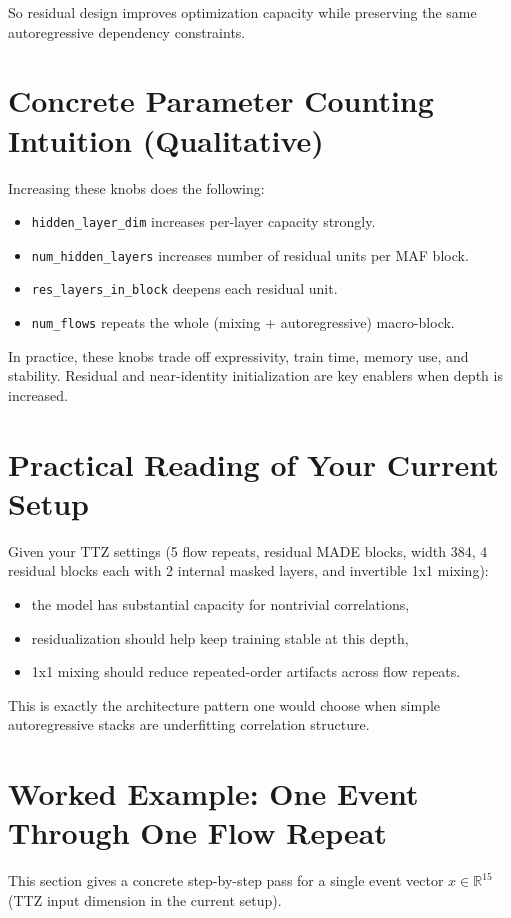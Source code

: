 \documentclass[11pt]{article}
\begin{document}
So residual design improves optimization capacity while preserving the same
autoregressive dependency constraints.

\section{Concrete Parameter Counting Intuition (Qualitative)}
Increasing these knobs does the following:
\begin{itemize}[leftmargin=*]
\item \texttt{hidden\_layer\_dim} increases per-layer capacity strongly.
\item \texttt{num\_hidden\_layers} increases number of residual units per MAF block.
\item \texttt{res\_layers\_in\_block} deepens each residual unit.
\item \texttt{num\_flows} repeats the whole (mixing + autoregressive) macro-block.
\end{itemize}

In practice, these knobs trade off expressivity, train time, memory use, and
stability. Residual and near-identity initialization are key enablers when
depth is increased.

\section{Practical Reading of Your Current Setup}
Given your TTZ settings (5 flow repeats, residual MADE blocks, width 384,
4 residual blocks each with 2 internal masked layers, and invertible 1x1 mixing):
\begin{itemize}[leftmargin=*]
\item the model has substantial capacity for nontrivial correlations,
\item residualization should help keep training stable at this depth,
\item 1x1 mixing should reduce repeated-order artifacts across flow repeats.
\end{itemize}

This is exactly the architecture pattern one would choose when simple
autoregressive stacks are underfitting correlation structure.

\section{Worked Example: One Event Through One Flow Repeat}
This section gives a concrete step-by-step pass for a single event vector
$x\in\mathbb{R}^{15}$ (TTZ input dimension in the current setup).
\end{document}
